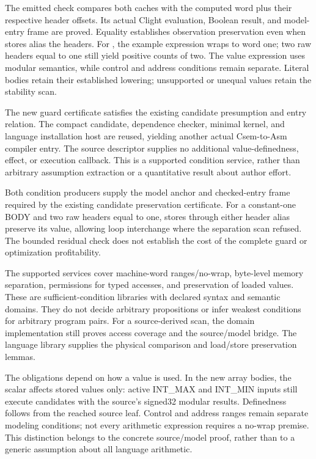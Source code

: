 The emitted check compares both caches with the computed word plus their
respective header offsets. Its actual Clight evaluation, Boolean result, and
model-entry frame are proved. Equality establishes observation preservation
even when stores alias the headers. For , the example
expression wraps to word one; two raw headers equal to one still yield positive
counts of two. The value expression uses modular semantics, while control and
address conditions remain separate. Literal bodies retain their established
lowering; unsupported or unequal values retain the stability scan.

The new guard certificate satisfies the existing candidate presumption and
entry relation. The compact candidate, dependence checker, minimal kernel,
and language installation host are reused, yielding another actual
Csem-to-Asm compiler entry. The source descriptor supplies no additional
value-definedness, effect, or execution callback. This is a supported
condition service, rather than arbitrary assumption extraction or a
quantitative result about author effort.

Both condition producers supply the model anchor and checked-entry frame
required by the existing candidate preservation certificate. For a constant-one BODY and two raw
headers equal to one, stores through either header alias preserve its value,
allowing loop interchange where the separation scan refused. The bounded
residual check does not establish the cost of the complete guard or
optimization profitability.

The supported services cover machine-word ranges/no-wrap, byte-level memory
separation, permissions for typed accesses, and preservation of loaded values.
These are sufficient-condition libraries with declared syntax and semantic
domains. They do not decide arbitrary propositions or infer weakest conditions
for arbitrary program pairs. For a source-derived scan, the domain implementation
still proves access coverage and the source/model bridge. The language library
supplies the physical comparison and load/store preservation lemmas.

The obligations depend on how a value is used. In the new array bodies, the
scalar  affects stored values only: active INT\_MAX and INT\_MIN
inputs still execute candidates with the source's signed32 modular results.
Definedness follows from the reached source leaf. Control and address ranges
remain separate modeling conditions; not every arithmetic expression requires a
no-wrap premise. This distinction belongs to the concrete source/model proof,
rather than to a generic assumption about all language arithmetic.

